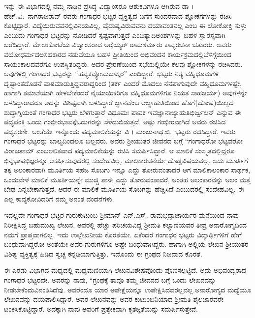 {ಇನ್ನು ಈ ವಿಭಾಗದಲ್ಲಿ ನಮ್ಮ ನಾಡಿನ ಪ್ರಸಿದ್ಧ ವಿದ್ವಾಂಸರೂ ಆಶುಕವಿಗಳೂ ಆಗಿರುವ ಡಾ । ಹೆಚ್.ವಿ.\ ನಾಗರಾಜರಾವ್ ರವರು ಗಂಗಾಧರ ಭಟ್ಟರ ವ್ಯಕ್ತಿತ್ವದ ಬಗೆಗೆ ಸುಂದರವಾದ ಶ್ಲೋಕಗಗಳನ್ನು ರಚಿಸಿ ಕೊಟ್ಟಿದ್ದಾರೆ. ವಿದ್ಯೆಯಿರುವವನಲ್ಲಿ\break ವಿನಯವಿಲ್ಲ, ವೈದುಷ್ಯವಿರುವವನು ದಯಾವಂತನಲ್ಲ ಎಂಬ ಈ ಲೋಕೋಕ್ತಿ ಸುಳ್ಳು ಎಂಬುದು ಗಂಗಾಧರ ಭಟ್ಟರನ್ನು ನೋಡಿದರೆ ಸ್ಪಷ್ಟವಾಗುತ್ತದೆ ಎಂಬಿತ್ಯಾದಿ\break ಅಂಶಗಳನ್ನು ಬಹಳ ಸ್ವಾರಸ್ಯವಾಗಿ ಬರೆದಿದ್ದಾರೆ. ಮೇಲುಕೋಟೆಯ ವಿದ್ವಾಂಸರಾದ ಅರೈಯ್ಯರ್ ರಾಮಶರ್ಮರು ಕಾವ್ಯರಚನಾ ಚತುರರು. ಅವರು ವಯೋಧರ್ಮದ\break ಅಸಹಕಾರದ ನಡುವೆಯೂ ಬಹಳ ಪ್ರೀತಿಯಿಂದ ಅಭಿವಂದನ ಕಾರ್ಯಕ್ರಮದಲ್ಲಿ\break ಬೆಳಿಗ್ಗೆಯಿಂದ ಸಾಯಂಕಾಲದವರೆಗೂ ಉಪಸ್ಥಿತರಿದ್ದರು. ಅದರ ಪ್ರೇರಣೆಯಿಂದ ಸಭೆಯಲ್ಲಿಯೇ ಕೆಲವು ಶ್ಲೋಕಗಳನ್ನು ರಚಿಸಿದರು. ಅವುಗಳಲ್ಲಿ ಗಂಗಾಧರ ಭಟ್ಟರನ್ನು “ಹವ್ಯಕ\enginline{-}ವ್ಯೋಮಭಾಸ್ಕರ” ಎಂದಿದ್ದಾರೆ. ಭಟ್ಟರು ನಿತ್ಯ ವಹ್ನಿಧೂಮಗಳ ದೃಷ್ಟಾಂತ\-ದೊಡನೆ ಪಾಠಮಾಡುತ್ತಿದ್ದವರಾದ್ದರಿಂದ (ತರ್ಕ ಎಂದರೆ ಮೊದಲು ನೆನಪಾಗುವುದೇ ವಹ್ನಿಧೂಮಗಳಷ್ಟೇ, ಹಾಗಾಗಿ ತಮಾಶೆಯಾಗಿ ಹೇಳಬೇಕೆಂದರೆ ನೈಯಾಯಿಕರಿಗೂ ವಹ್ನಿಧೂಮಗಳಿಗೂ ನಿಯತ ಸಾಹಚರ್ಯ) ಅವುಗಳನ್ನೇ ಬಳಸಿದ್ದಾರಾದರೂ ಅದನ್ನು ವಿಶಿಷ್ಟವಾಗಿ ಬಳಸಿದ್ದಾರೆ  \enginline{-} ಜ್ಞಾನವೆಂಬ ಆಜ್ಯಾಹುತಿಯಿಂದ ಹೊಗೆ(ದೋಷ)ಯಿಲ್ಲದ ಶುದ್ಧಾಗ್ನಿಯಂತೆ ಗಂಗಾಧರ ಭಟ್ಟರು ಬೆಳಗುತ್ತಾರೆ \enginline{-} ವಿಧೂಮಃ ಪಾವಕ ಇವ\break ಜ್ಞಾನಾಜ್ಯಾಹುತಿಭಿರ್ಜ್ವಲನ್ ಎನ್ನುವ ಈ ಪದ್ಯಪಂಕ್ತಿ ಒಂದು ಗಂಭೀರಭಾವಕ್ಕೆ\break ಓದುಗರನ್ನು ಸೆಳೆದುಬಿಡುತ್ತದೆ. ಅಷ್ಟು ಗಂಭೀರವಾಗಿದೆ ಅವರು ರಚಿಸಿದ ಪದ್ಯ\break ಸರಣೀ. ಅಂತೆಯೇ ಇನ್ನೊಂದು ಪದ್ಯಮಾಲಿಕೆಯನ್ನು ವಿ । ಮಂಜುನಾಥ.ಜಿ.\ ಭಟ್ಟರು ರಚಿಸಿ\-ದ್ದಾರೆ. ಇವರು ಗಂಗಾಧರ ಭಟ್ಟರನ್ನು ಬಾಲ್ಯದಿಂದಲೂ ಬಲ್ಲವರು. ಅವರು ಶ್ರೀಯುತರ ಜೀವನದ ಬಗ್ಗೆ “ಗಂಗಾಧರೋ  ಭಟ್ಟವರೋ ವಿರಾಜತಾಮ್  ಎಂಬ\break ಲಲಿತವಾದ ಪದ್ಯಮಾಲಿಕೆಯನ್ನು ರಚಿಸಿ ಸಮರ್ಪಿಸಿದ್ದಾರೆ. ಆ ಮಾಲಿಕೆ ಸಂಸ್ಕೃತ\-ದಲ್ಲಿದ್ದರೂ ಭಿನ್ನಭಾಷಭಿಜ್ಞರನ್ನೂ ಆಕರ್ಷಿಸುವುದರಲ್ಲಿ ಸಂದೇಹವಿಲ್ಲ. ಮಾಲಿಕಾ\-ರಚನೆಯೇ ದೊಡ್ಡವಿಷಯವಲ್ಲ. ಅದು ಮೂರ್ತಿಗೆ ತಕ್ಕ ಅಲಂಕಾರವಾಗಿ ಮೂರ್ತಿಯ ಸಹಜ ಸೊಬಗು ಇನ್ನೂ ಎದ್ದು ತೋರುವಂತಾದರೆ ಆಗ ಮಾಲಿಕಾಲಂಕಾರ ಸಾರ್ಥಕ, ಒಂದುವೇಳೆ ಮಾಲಿಕೆ ಮೂರ್ತಿಯನ್ನೇ ಮುಚ್ಚಿ ತಾನೇ ಎದ್ದು ತೋರುವಂತಾದರೆ, ಅಂತಹ ಅಲಂಕಾರವನ್ನು ಅಲಂ \enginline{-} ಮತ್ತೆ ಬೇಡ ಎನ್ನಬೇಕಾಗುತ್ತದೆ. ಆದರೆ ಈ \hbox{ಮಾಲಿಕೆ} ಮೂರ್ತಿಯ ಸೊಬಗನ್ನು ಹೆಚ್ಚಿಸಿದೆ ಎಂಬುದರಲ್ಲಿ ಸಂದೇಹವಿಲ್ಲ. ಈ ಎಲ್ಲ ಕಾವ್ಯ\-ಕೋವಿದರಿಗೆ ನಮ್ಮ ಅನಂತ ವಂದನೆಗಳು. 

ಇದಲ್ಲದೇ ಗಂಗಾಧರ ಭಟ್ಟರ ಗುರುಕುಟುಂಬ \enginline{-} ಶ್ರೀಮಾನ್ ಎನ್.ಎಸ್. ರಾಮ\-ಭದ್ರಾಚಾರ್ಯರ ಮನೆಯಿಂದ ನಾವು ನಿರೀಕ್ಷಿಸಿದ್ದ ಬಹುಮುಖ್ಯ ಲೇಖನ, ಅವರಲ್ಲಿ ಹೆಚ್ಚು ಪರಿಚಯವಿದ್ದ ಶ್ರೀಮತಿ ಕಲ್ಯಾಣಿಯವರ ತೀವ್ರ ಅನಾರೋಗ್ಯದಿಂದ  ನಮಗೆ ಪ್ರಾಪ್ತವಾಗಲಿಲ್ಲ. ಇದು ಉಲ್ಲೇಖನೀಯ ಕೊರತೆಯೇ. ಏಕೆಂದರೆ ಗಂಗಾಧರ ಭಟ್ಟರು ವಿದ್ಯಾರ್ಥಿಗಳಿಗೆ ಹೇಗೆ ಬಂಧುವಾಗಿದ್ದರೋ ಅಂತೆಯೇ ಅವರ ಗುರುಗಳಿಗೂ ಅಷ್ಟೇ ಬಂಧುವಾಗಿದ್ದರು. ಹಾಗಾಗಿ ಅಲ್ಲಿಯ ಲೇಖನ ಶ್ರೀಯುತರ ವಿಶಿಷ್ಟ ವ್ಯಕ್ತಿತ್ವಕ್ಕೆ ಹಿಡಿದ ಸ್ವಚ್ಛ ಕನ್ನಡಿಯಾಗುತ್ತಿತ್ತು. ಇದೊಂದು ಈ ಗ್ರಂಥದ ನಿಜವಾದ ಕೊರತೆ.

ಈ ಎರಡು ವಿಭಾಗದ ಮಧ್ಯದಲ್ಲಿ ಮಧ್ಯಮಣಿಯಾಗಿ ಲೇಖನವಿಶೇಷವೊಂದು ಪೊಣಿಸಲ್ಪಟ್ಟಿದೆ. ಅದು ಅಭಿವಂದ್ಯರಾದ ಗಂಗಾಧರ ಭಟ್ಟರದೇ. ಅವರನ್ನು ನಾವು, “ಗ್ರಂಥಕ್ಕೆ ತಾವೂ ತಮ್ಮ ಜೀವನದ ಬಗ್ಗೆ ಒಂದು ಲೇಖನವನ್ನು ನೀಡಬೇಕೆಂದು\break ವಿನಂತಿಸಿದೆವು. ಅವರೆಂದೂ ಯಾರ ಅಪೇಕ್ಷೆಯನ್ನೂ ಉಪೇಕ್ಷಿಸಿದವರಲ್ಲವಲ್ಲ.\break ಅನಾರೋಗ್ಯದ ಮಧ್ಯೆಯೂ ಲೇಖನವನ್ನು ದಯಪಾಲಿಸಿದ್ದಾರೆ. ಅವರ ಲೇಖನವನ್ನು ಅವರ ಕುಟುಂಬಿನಿಯಾದ \enginline{-} ಶ್ರೀಮತಿ ಶೈಲಜಾರವರೇ ಟಂಕಿಸಿಕೊಟ್ಟಿದ್ದಾರೆ. ಅದಕ್ಕಾಗಿ ನಾವು ಅವರಿಗೆ ಪ್ರತ್ಯೇಕವಾಗಿ ಕೃತಜ್ಞತೆಯನ್ನು ಸಮರ್ಪಿಸುತ್ತೇವೆ.

}
